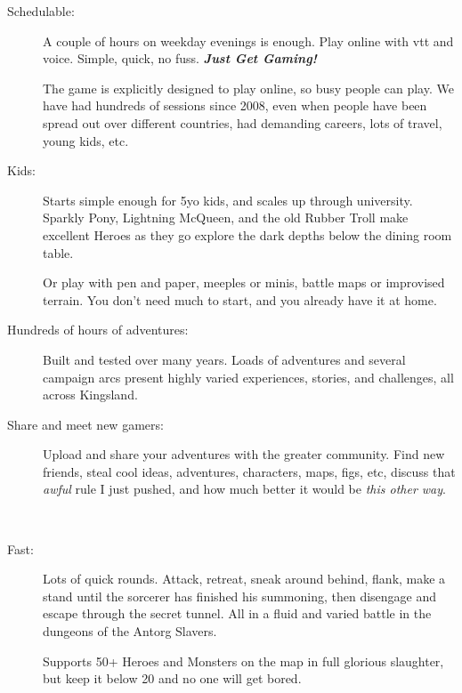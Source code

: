 
\begin{description}


\item[Schedulable:] A couple of hours on weekday evenings is enough. Play online with vtt and voice. Simple, quick, no fuss. 
\textbf{\textit{Just Get Gaming!}} 

The game is explicitly designed to play online, so busy people can play. We have had hundreds of sessions since 2008, even when people have been spread out over different countries, had demanding careers, lots of travel, young kids, etc.


\item[Kids:] Starts simple enough for 5yo kids, and scales up through university. Sparkly Pony, Lightning McQueen, and the old Rubber Troll make excellent Heroes as they go explore the dark depths below the dining room table.

Or play with pen and paper, meeples or minis, battle maps or improvised terrain. You don't need much to start, and you already have it at home.


\item[Hundreds of hours of adventures:] Built and tested over many years. Loads of adventures and several campaign arcs present highly varied experiences, stories, and challenges, all across Kingsland. 


\item[Share and meet new gamers:] Upload and share your adventures with the greater community. Find new friends, steal cool ideas, adventures, characters, maps, figs, etc, discuss that \emph{awful} rule I just pushed, and how much better it would be \emph{this other way}.

\

\item[Fast:] Lots of quick rounds. Attack, retreat, sneak around behind, flank, make a stand until the sorcerer has finished his summoning, then disengage and escape through the secret tunnel. All in a fluid and varied battle in the dungeons of the Antorg Slavers.

Supports 50+ Heroes and Monsters on the map in full glorious slaughter, but keep it below 20 and no one will get bored.


\end{description}

